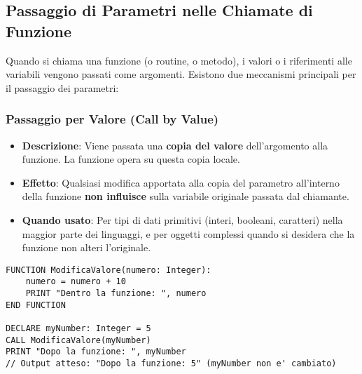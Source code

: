\subsection{Passaggio di Parametri nelle Chiamate di Funzione}
Quando si chiama una funzione (o routine, o metodo), i valori o i riferimenti alle variabili vengono passati come argomenti. Esistono due meccanismi principali per il passaggio dei parametri:

\subsubsection{Passaggio per Valore (Call by Value)}
\begin{itemize}
    \item \textbf{Descrizione}: Viene passata una \textbf{copia del valore} dell'argomento alla funzione. La funzione opera su questa copia locale.
    \item \textbf{Effetto}: Qualsiasi modifica apportata alla copia del parametro all'interno della funzione \textbf{non influisce} sulla variabile originale passata dal chiamante.
    \item \textbf{Quando usato}: Per tipi di dati primitivi (interi, booleani, caratteri) nella maggior parte dei linguaggi, e per oggetti complessi quando si desidera che la funzione non alteri l'originale.
\end{itemize}
\begin{lstlisting}[language=Pseudocode, caption={Esempio di Passaggio per Valore}]
FUNCTION ModificaValore(numero: Integer):
    numero = numero + 10
    PRINT "Dentro la funzione: ", numero
END FUNCTION

DECLARE myNumber: Integer = 5
CALL ModificaValore(myNumber)
PRINT "Dopo la funzione: ", myNumber 
// Output atteso: "Dopo la funzione: 5" (myNumber non e' cambiato)
\end{lstlisting}

